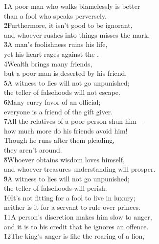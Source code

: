 \begin{poetry}
\poeml {}
\v{1}A poor man who walks blamelessly is better \\
\poeml than a fool who speaks perversely. \\
\poeml \v{2}Furthermore, it isn't good to be ignorant, \\
\poemll    and whoever rushes into things misses the mark. \\
\poeml \v{3}A man's foolishness ruins his life, \\
\poemll    yet his heart rages against the . \\
\poeml \v{4}Wealth brings many friends, \\
\poemll    but a poor man is deserted by his friend. \\
\poeml \v{5}A witness to lies will not go unpunished; \\
\poemll    the teller of falsehoods will not escape. \\
\poeml \v{6}Many curry favor of an official; \\
\poemll    everyone is a friend of the gift giver. \\
\poeml \v{7}All the relatives of a poor person shun him--- \\
\poemll    how much more do his friends avoid him! \\
\poeml Though he runs after them pleading, \\
\poemll    they aren't around. \\
\poeml \v{8}Whoever obtains wisdom loves himself, \\
\poemll    and whoever treasures understanding will prosper. \\
\poeml \v{9}A witness to lies will not go unpunished; \\
\poemll    the teller of falsehoods will perish. \\
\poeml \v{10}It's not fitting for a fool to live in luxury; \\
\poemll    neither is it for a servant to rule over princes. \\
\poeml \v{11}A person's discretion makes him slow to anger, \\
\poemll    and it is to his credit that he ignores an offence. \\
\poeml \v{12}The king's anger is like the roaring of a lion, \\

\end{poetry}
